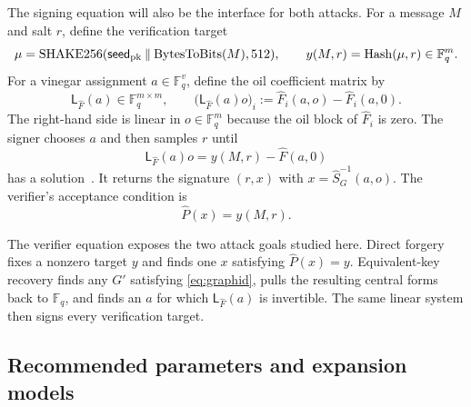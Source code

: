 \documentclass[11pt,a4paper]{article}
\theoremstyle{definition}
\theoremstyle{remark}
\newcommand{\F}{\mathbb F}
\begin{document}
The signing equation will also be the interface for both attacks.  For a
message $M$ and salt $r$, define the verification target
\begin{equation}\label{eq:verification-target}
 \mu=\operatorname{SHAKE256}(\mathsf{seed}_{\rm pk}
       \mathbin\|\operatorname{BytesToBits}(M),512),
 \qquad
 y(M,r)=\operatorname{Hash}(\mu,r)\in\F_q^m.
\end{equation}
For a vinegar assignment $a\in\F_q^v$, define the oil coefficient matrix by
\begin{equation}\label{eq:signing-matrix}
 \mathsf L_{\widehat F}(a)\in\F_q^{m\times m},
 \qquad
 \bigl(\mathsf L_{\widehat F}(a)o\bigr)_i
 :=\widehat F_i(a,o)-\widehat F_i(a,0).
\end{equation}
The right-hand side is linear in $o\in\F_q^m$ because the oil block of
$\widehat F_i$ is zero.  The signer chooses $a$ and then samples $r$ until
\begin{equation}\label{eq:honest-oil-system}
 \mathsf L_{\widehat F}(a)o
 =y(M,r)-\widehat F(a,0)
\end{equation}
has a solution~\cite[Sec.~4.2]{QRUOVSpec}.  It returns the signature $(r,x)$
with $x=\widehat S_G^{-1}(a,o)$.  The verifier's acceptance condition is
~\cite[Sec.~4.3]{QRUOVSpec}
\begin{equation}\label{eq:verification-equation}
 \widehat P(x)=y(M,r).
\end{equation}

The verifier equation exposes the two attack goals studied here.  Direct
forgery fixes a nonzero target $y$ and finds one $x$ satisfying
$\widehat P(x)=y$.  Equivalent-key recovery finds any $G'$ satisfying
\eqref{eq:graphid}, pulls the resulting central forms back to $\F_q$, and
finds an $a$ for which $\mathsf L_{\widehat F}(a)$ is invertible.  The same
linear system then signs every verification target.

\subsection{Recommended parameters and expansion models}
\end{document}
